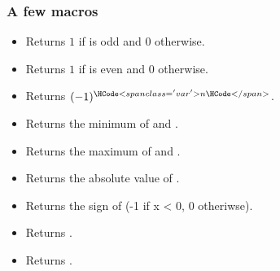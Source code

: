 \subsubsection{A few macros}
\begin{itemize}
\item {}
  \sshortdescribe Returns $1$ if  is odd and $0$ otherwise.
\item {}
  \sshortdescribe Returns $1$ if  is even and $0$ otherwise.
\item {}
  \sshortdescribe Returns $(-1)^{\var{n}}$.
\item {}
  \sshortdescribe Returns the minimum of  and .
\item {}
  \sshortdescribe Returns the maximum of  and .
\item {}
  \sshortdescribe Returns the absolute value of .
\item {}
  \sshortdescribe Returns the sign of  (-1 if x < 0, 0 otheriwse).
\item {}
  \sshortdescribe Returns .
\item {}
  \sshortdescribe Returns .
\end{itemize}

